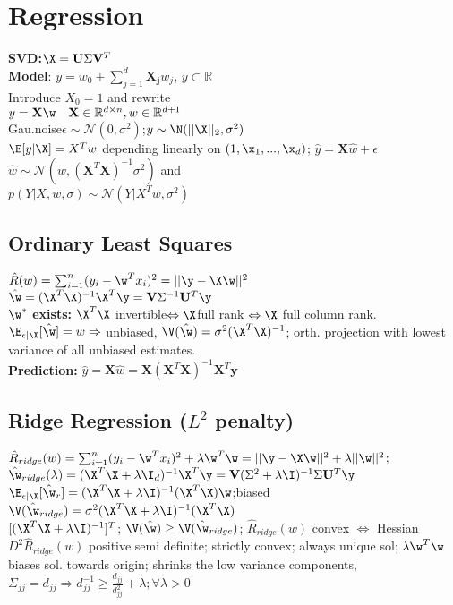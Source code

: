 \section*{Regression}
\textbf{SVD:}$\X=\mathbf{U}\Sigma\mathbf{V}^T$\\
\textbf{Model}:
$y=w_0 + \sum_{j=1}^d\mathbf{X_j} w_j$, $y\subset{\mathbb{R}}$\\
Introduce $X_0=1$ and rewrite\\
$y=\mathbf{X} \w \quad \mathbf{X}\in\mathbb{R}^{d\times n},  w \in \mathbb{R}^{d+1}$\\
Gau.noise$\epsilon \sim \mathcal{N}(0,\sigma^2)$;$y\sim \N(||\X||_2,\sigma^2)$\\
$\E[y|\X]=X^T w$
depending linearly on $(1,\x_1,...,\x_d)$;
$\hat{y}=\mathbf{X}\hat{ w}+\epsilon$\\
$\hat{ w} \sim \mathcal{N}( w, (\mathbf{X}^T\mathbf{X})^{-1}\sigma^2) $ and\\
$p(Y|X, w, \sigma) \sim \mathcal{N}(Y|X^T w, \sigma^2)$



\subsection*{Ordinary Least Squares}
$\hat R(w)=\sum_{i=1}^n(y_i-\w^T x_i)^2=||\y-\X\w||^2$\\
$\hat \w = (\X^T\X)^{-1}\X^T\y=\mathbf{V}\Sigma^{-1}\mathbf{U}^T\y$\\
$\w^*$ \textbf{exists:} $\X^T\X$ invertible$\Leftrightarrow \X$full rank $\Leftrightarrow \X$ full column rank.
$\E_{\epsilon |\X}[\hat\w]=w\Rightarrow$ unbiased, $\V(\hat \w)=\sigma^2(\X^T\X)^{-1}$;
orth. projection with lowest variance of all unbiased estimates.\\
\textbf{Prediction:} $\hat{y}{=}\mathbf{X}\hat{ w}{=}\mathbf{X}(\mathbf{X}^T\mathbf{X})^{-1}\mathbf{X}^{T}\mathbf{y}$
\subsection*{Ridge Regression ($L^2$ penalty)}
$\hat R_{ridge}(w)=\sum_{i=1}^n(y_i-\w^T x_i)^2+\lambda\w^T\w=||\y-\X\w||^2+\lambda||\w||^2$;
$\hat \w_{ridge}(\lambda)=(\X^T\X+\lambda \I_d)^{-1}\X^T\y=\mathbf{V}(\Sigma^2+\lambda \I)^{-1}\Sigma\mathbf{U}^T\y$\\
$\E_{\epsilon |\X}[\hat\w_{r}]=(\X^T\X+\lambda\I)^{-1}(\X^T\X)\w$;biased
$\V(\hat \w_{ridge})=\sigma^2(\X^T\X+\lambda\I)^{-1}(\X^T\X)$\\$[(\X^T\X+\lambda\I)^{-1}]^T$;
$\V(\hat \w)\geq\V(\hat \w_{ridge})$;
$\hat R_{ridge}(w)$ convex $\Leftrightarrow$ Hessian $D^2\hat R_{ridge}(w)$ positive semi definite;
strictly convex; always unique sol; $\lambda \w^T\w$  biases sol. towards origin; shrinks the low variance components, $\Sigma_{jj}=d_{jj}\Rightarrow d_{jj}^{-1}\geq \frac{d_{jj}}{d_{jj}^2}+\lambda; \forall \lambda >0$

